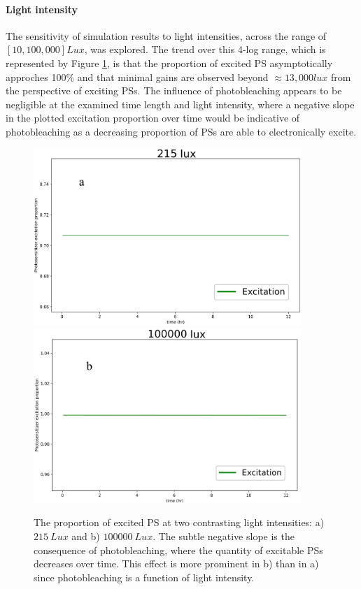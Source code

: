 \paragraph{Light intensity}
The sensitivity of simulation results to light intensities, across the range of $[10, 100,000] Lux$, was explored. The trend over this 4-log range, which is represented by Figure \ref{light_intensities}, is that the proportion of excited PS asymptotically approches 100\% and that minimal gains are observed beyond $\approx 13,000 lux$ from the perspective of exciting PSs. The influence of photobleaching appears to be negligible at the examined time length and light intensity, where a negative slope in the plotted excitation proportion over time would be indicative of photobleaching as a decreasing proportion of PSs are able to electronically excite.

\begin{figure}
    \centering
    \includegraphics[width = 0.9\textwidth]{images/PDIpy/sensitivity_analyses/215_lux.png} \\
    \vspace{5mm}
    \midrule
    \vspace{5mm}
    \includegraphics[width = 0.9\textwidth]{images/PDIpy/sensitivity_analyses/100000_lux.png}
    \caption{
        The proportion of excited PS at two contrasting light intensities: a) $215~Lux$ and b) $100000~Lux$. The subtle negative slope is the consequence of photobleaching, where the quantity of excitable PSs decreases over time. This effect is more prominent in b) than in a) since photobleaching is a function of light intensity.
    }
    \label{light_intensities}
\end{figure}

